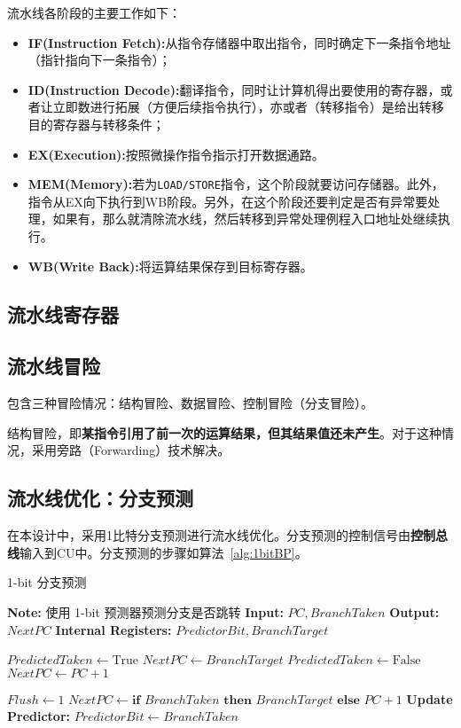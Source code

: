 \documentclass[lang=cn,a4paper,newtx]{elegantpaper}
\begin{document}
流水线各阶段的主要工作如下：
\begin{itemize}
  \item \textbf{IF(Instruction Fetch):}从指令存储器中取出指令，同时确定下一条指令地址（指针指向下一条指令）；
  \item \textbf{ID(Instruction Decode):}翻译指令，同时让计算机得出要使用的寄存器，或者让立即数进行拓展（方便后续指令执行），亦或者（转移指令）是给出转移目的寄存器与转移条件；
  \item \textbf{EX(Execution):}按照微操作指令指示打开数据通路。
  \item \textbf{MEM(Memory):}若为\texttt{LOAD/STORE}指令，这个阶段就要访问存储器。此外，指令从EX向下执行到WB阶段。另外，在这个阶段还要判定是否有异常要处理，如果有，那么就清除流水线，然后转移到异常处理例程入口地址处继续执行。
  \item \textbf{WB(Write Back):}将运算结果保存到目标寄存器。
\end{itemize}
\subsection{流水线寄存器}
\subsection{流水线冒险}
包含三种冒险情况：结构冒险、数据冒险、控制冒险（分支冒险）。\cite{zhihu453232311}

结构冒险，即\textbf{某指令引用了前一次的运算结果，但其结果值还未产生}。对于这种情况，采用旁路（Forwarding）技术解决。
\subsection{流水线优化：分支预测}
在本设计中，采用1比特分支预测进行流水线优化。分支预测的控制信号由\textbf{控制总线}输入到CU中。分支预测的步骤如算法~\ref{alg:1bitBP}。

\begin{algorithm}[htbp]
  \caption{1-bit 分支预测}
  \label{alg:1bitBP}
  \begin{algorithmic}[1]
  \State \textbf{Note:} 使用 1-bit 预测器预测分支是否跳转
  \State \textbf{Input:} $PC, BranchTaken$
  \State \textbf{Output:} $NextPC$
  \State \textbf{Internal Registers:} $PredictorBit, BranchTarget$

          \State $PredictedTaken \gets \text{True}$
          \State $NextPC \gets BranchTarget$
      \Else
          \State $PredictedTaken \gets \text{False}$
          \State $NextPC \gets PC + 1$
      \EndIf
  \EndProcedure

        
          \State $Flush \gets 1$  
          \State $NextPC \gets \textbf{if } BranchTaken \textbf{ then } BranchTarget \textbf{ else } PC + 1$
      \EndIf
      \State \textbf{Update Predictor:}
      \State $PredictorBit \gets BranchTaken$  
  \EndProcedure
  \end{algorithmic}
\end{algorithm}
\end{document}
